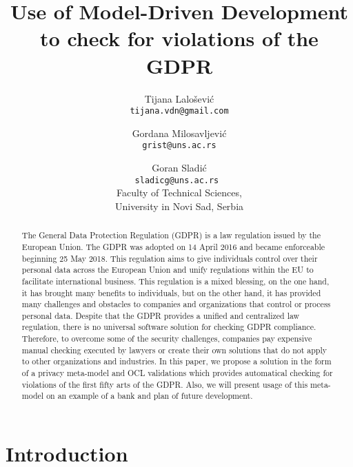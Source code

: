 \documentclass[11pt,english]{article}
\begin{document}
\title{Use of Model-Driven Development to check for violations of the GDPR}
\author{
  Tijana Lalošević\\
  \texttt{tijana.vdn@gmail.com}
  \and
  Gordana Milosavljević\\
  \texttt{grist@uns.ac.rs}
  \and
  Goran Sladić\\
  \texttt{sladicg@uns.ac.rs }
  \\Faculty of Technical Sciences,\\ University in Novi Sad, Serbia
}


\date{}
\maketitle


\begin{abstract}
The General Data Protection Regulation (GDPR) is a law regulation issued by the European Union. The GDPR was adopted on 14 April 2016 and became enforceable beginning 25 May 2018. This regulation aims to give individuals control over their personal data across the European Union and unify regulations within the EU to facilitate international business. This regulation is a mixed blessing, on the one hand, it has brought many benefits to individuals, but on the other hand, it has provided many challenges and obstacles to companies and organizations that control or process personal data. Despite that the GDPR provides a unified and centralized law regulation, there is no universal software solution for checking GDPR compliance. Therefore, to overcome some of the security challenges, companies pay expensive manual checking executed by lawyers or create their own solutions that do not apply to other organizations and industries. In this paper, we propose a solution in the form of a privacy meta-model and OCL validations which provides automatical checking for violations of the first fifty arts of the GDPR. Also, we will present usage of this meta-model on an example of a bank and plan of future development.
\end{abstract}

\section{Introduction}
\end{document}
